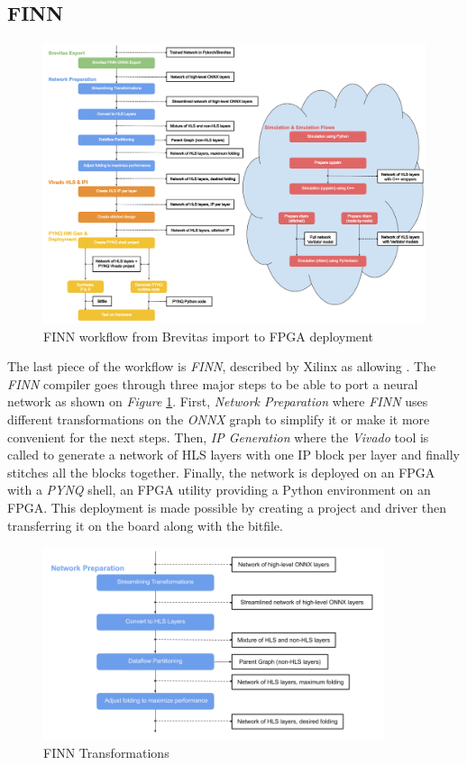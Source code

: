 \subsection{FINN}

\begin{figure}[htbp]
	\centering
		\includegraphics[width=16cm]{Figures/FINNWholeFlow.png}
	\caption[FINN whole flow]{FINN workflow from Brevitas import to FPGA deployment}
	\label{fig:FINNWholeFlow}
\end{figure}

The last piece of the workflow is \emph{FINN}, described by Xilinx as allowing . The \emph{FINN} compiler goes through three major steps to be able to port a neural network as shown on \emph{Figure} \ref{fig:FINNWholeFlow}. First, \emph{Network Preparation} where \emph{FINN} uses different transformations on the \emph{ONNX} graph to simplify it or make it more convenient for the next steps. Then, \emph{IP Generation} where the \emph{Vivado} tool is called to generate a network of HLS layers with one IP block per layer and finally stitches all the blocks together. Finally, the network is deployed on an FPGA with a \emph{PYNQ} shell, an FPGA utility providing a Python environment on an FPGA. This deployment is made possible by creating a project and driver then transferring it on the board along with the bitfile.

\begin{figure}[htbp]
	\centering
		\includegraphics[width=10cm]{Figures/FINNTransformations.png}
	\caption[FINN Transformations]{FINN Transformations}
	\label{fig:FINNTransformations}
\end{figure}

